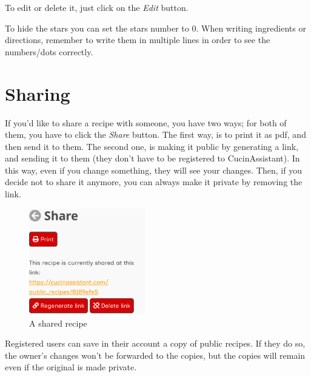 \documentclass[12pt, a4paper]{report}
\begin{document}
    To edit or delete it, just click on the \emph{Edit} button.

    To hide the stars you can set the stars number to 0. When writing ingredients or directions, remember to write them in multiple lines in order to
    see the numbers/dots correctly.

	\section{Sharing} \label{recipesharing}

	If you'd like to share a recipe with someone, you have two ways; for both of them, you have to click the \emph{Share} button.
	The first way, is to print it as pdf, and then send it to them.
	The second one, is making it public by generating a link, and sending it to them (they don't have to be registered to CucinAssistant).
	In this way, even if you change something, they will see your changes. Then, if you decide not to share it anymore, you can always make it
	private by removing the link.

    \begin{figure}[H]
        \centering
        \includegraphics[width=0.45\textwidth]{assets/en/recipe_sharing.png}
        \caption{A shared recipe}
    \end{figure}

	Registered users can save in their account a copy of public recipes. If they do so, the owner's changes won't be forwarded to the copies, but the
	copies will remain even if the original is made private.
\end{document}

